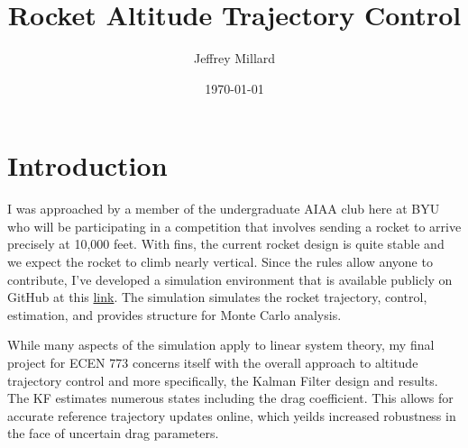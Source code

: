 \documentclass{article}
\title{Rocket Altitude Trajectory Control}
\date{\today}
\author{Jeffrey Millard}
\begin{document}
\maketitle


\section{Introduction}
  I was approached by a member of the undergraduate AIAA club here at BYU who will be participating in a competition that involves sending a rocket to arrive precisely at 10,000 feet. With fins, the current rocket design is quite stable and we expect the rocket to climb nearly vertical. Since the rules allow anyone to contribute, I've developed a simulation environment that is available publicly on GitHub at this \href{http://www.texample.net/tikz/resources/}{link}. The simulation simulates the rocket trajectory, control, estimation, and provides structure for Monte Carlo analysis.

  While many aspects of the simulation apply to linear system theory, my final project for ECEN 773 concerns itself with the overall approach to altitude trajectory control and more specifically, the Kalman Filter design and results. The KF estimates numerous states including the drag coefficient. This allows for accurate reference trajectory updates online, which yeilds increased robustness in the face of uncertain drag parameters.
\end{document}

